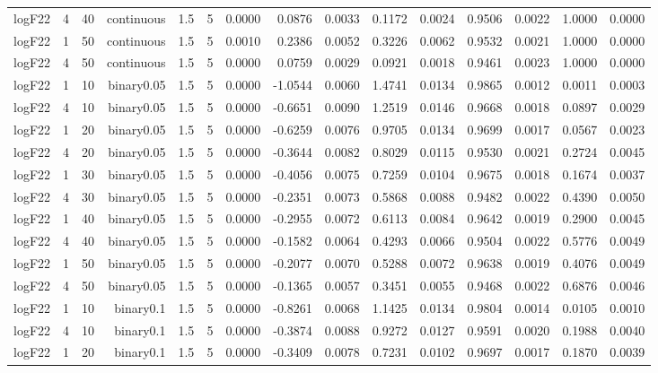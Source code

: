 \begin{longtable}{rrrrrrrrrrrrrrr}
  logF22 & 4 & 40 & continuous & 1.5 & 5 & 0.0000 & 0.0876 & 0.0033 & 0.1172 & 0.0024 & 0.9506 & 0.0022 & 1.0000 & 0.0000 \\ 
  logF22 & 1 & 50 & continuous & 1.5 & 5 & 0.0010 & 0.2386 & 0.0052 & 0.3226 & 0.0062 & 0.9532 & 0.0021 & 1.0000 & 0.0000 \\ 
  logF22 & 4 & 50 & continuous & 1.5 & 5 & 0.0000 & 0.0759 & 0.0029 & 0.0921 & 0.0018 & 0.9461 & 0.0023 & 1.0000 & 0.0000 \\ 
  logF22 & 1 & 10 & binary0.05 & 1.5 & 5 & 0.0000 & -1.0544 & 0.0060 & 1.4741 & 0.0134 & 0.9865 & 0.0012 & 0.0011 & 0.0003 \\ 
  logF22 & 4 & 10 & binary0.05 & 1.5 & 5 & 0.0000 & -0.6651 & 0.0090 & 1.2519 & 0.0146 & 0.9668 & 0.0018 & 0.0897 & 0.0029 \\ 
  logF22 & 1 & 20 & binary0.05 & 1.5 & 5 & 0.0000 & -0.6259 & 0.0076 & 0.9705 & 0.0134 & 0.9699 & 0.0017 & 0.0567 & 0.0023 \\ 
  logF22 & 4 & 20 & binary0.05 & 1.5 & 5 & 0.0000 & -0.3644 & 0.0082 & 0.8029 & 0.0115 & 0.9530 & 0.0021 & 0.2724 & 0.0045 \\ 
  logF22 & 1 & 30 & binary0.05 & 1.5 & 5 & 0.0000 & -0.4056 & 0.0075 & 0.7259 & 0.0104 & 0.9675 & 0.0018 & 0.1674 & 0.0037 \\ 
  logF22 & 4 & 30 & binary0.05 & 1.5 & 5 & 0.0000 & -0.2351 & 0.0073 & 0.5868 & 0.0088 & 0.9482 & 0.0022 & 0.4390 & 0.0050 \\ 
  logF22 & 1 & 40 & binary0.05 & 1.5 & 5 & 0.0000 & -0.2955 & 0.0072 & 0.6113 & 0.0084 & 0.9642 & 0.0019 & 0.2900 & 0.0045 \\ 
  logF22 & 4 & 40 & binary0.05 & 1.5 & 5 & 0.0000 & -0.1582 & 0.0064 & 0.4293 & 0.0066 & 0.9504 & 0.0022 & 0.5776 & 0.0049 \\ 
  logF22 & 1 & 50 & binary0.05 & 1.5 & 5 & 0.0000 & -0.2077 & 0.0070 & 0.5288 & 0.0072 & 0.9638 & 0.0019 & 0.4076 & 0.0049 \\ 
  logF22 & 4 & 50 & binary0.05 & 1.5 & 5 & 0.0000 & -0.1365 & 0.0057 & 0.3451 & 0.0055 & 0.9468 & 0.0022 & 0.6876 & 0.0046 \\ 
  logF22 & 1 & 10 & binary0.1 & 1.5 & 5 & 0.0000 & -0.8261 & 0.0068 & 1.1425 & 0.0134 & 0.9804 & 0.0014 & 0.0105 & 0.0010 \\ 
  logF22 & 4 & 10 & binary0.1 & 1.5 & 5 & 0.0000 & -0.3874 & 0.0088 & 0.9272 & 0.0127 & 0.9591 & 0.0020 & 0.1988 & 0.0040 \\ 
  logF22 & 1 & 20 & binary0.1 & 1.5 & 5 & 0.0000 & -0.3409 & 0.0078 & 0.7231 & 0.0102 & 0.9697 & 0.0017 & 0.1870 & 0.0039 \\ 

\end{longtable}
